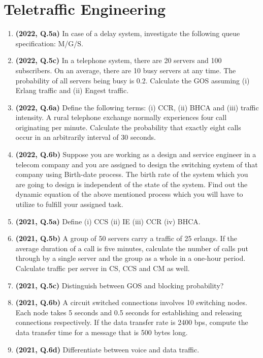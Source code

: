 \documentclass[12pt, a4paper]{article}
\begin{document}
	\section{Teletraffic Engineering}
	\begin{enumerate}
		\item \textbf{(2022, Q.5a)} In case of a delay system, investigate the following queue specification: M/G/S.
		\item \textbf{(2022, Q.5c)} In a telephone system, there are 20 servers and 100 subscribers. On an average, there are 10 busy servers at any time. The probability of all servers being busy is 0.2. Calculate the GOS assuming (i) Erlang traffic and (ii) Engest traffic.
		\item \textbf{(2022, Q.6a)} Define the following terms: (i) CCR, (ii) BHCA and (iii) traffic intensity. A rural telephone exchange normally experiences four call originating per minute. Calculate the probability that exactly eight calls occur in an arbitrarily interval of 30 seconds.
		\item \textbf{(2022, Q.6b)} Suppose you are working as a design and service engineer in a telecom company and you are assigned to design the switching system of that company using Birth-date process. The birth rate of the system which you are going to design is independent of the state of the system. Find out the dynamic equation of the above mentioned process which you will have to utilize to fulfill your assigned task.
		
		\item \textbf{(2021, Q.5a)} Define (i) CCS (ii) IE (iii) CCR (iv) BHCA.
		\item \textbf{(2021, Q.5b)} A group of 50 servers carry a traffic of 25 erlangs. If the average duration of a call is five minutes, calculate the number of calls put through by a single server and the group as a whole in a one-hour period. Calculate traffic per server in CS, CCS and CM as well.
		\item \textbf{(2021, Q.5c)} Distinguish between GOS and blocking probability?
		\item \textbf{(2021, Q.6b)} A circuit switched connections involves 10 switching nodes. Each node takes 5 seconds and 0.5 seconds for establishing and releasing connections respectively. If the data transfer rate is 2400 bps, compute the data transfer time for a message that is 500 bytes long.
		\item \textbf{(2021, Q.6d)} Differentiate between voice and data traffic.
		

\end{enumerate}
\end{document}
